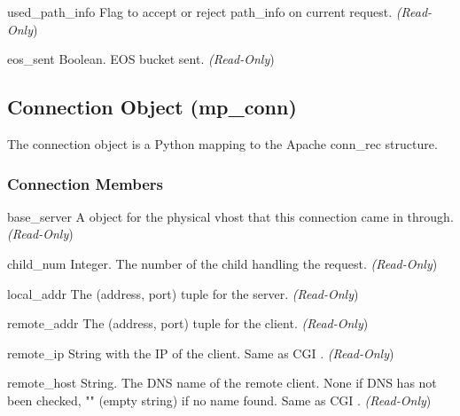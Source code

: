 \begin{memberdesc}[Request]{used_path_info}
Flag to accept or reject path_info on current request.
\emph{(Read-Only})
\end{memberdesc}

\begin{memberdesc}[Request]{eos_sent}
Boolean. EOS bucket sent.
\emph{(Read-Only})
\end{memberdesc}

\subsection{Connection Object (mp_conn)\label{pyapi-mpconn}}

The connection object is a Python mapping to the Apache conn_rec
structure.

\subsubsection{Connection Members\label{pyapi-mpconn-mem}}

\begin{memberdesc}[connection]{base_server}
A  object for the physical vhost that this connection came in
through.
\emph{(Read-Only})
\end{memberdesc}

\begin{memberdesc}[connection]{child_num}
Integer. The number of the child handling the request.
\emph{(Read-Only})
\end{memberdesc}

\begin{memberdesc}[connection]{local_addr}
The (address, port) tuple for the server.
\emph{(Read-Only})
\end{memberdesc}

\begin{memberdesc}[connection]{remote_addr}
The (address, port) tuple for the client.
\emph{(Read-Only})
\end{memberdesc}

\begin{memberdesc}[connection]{remote_ip}
String with the IP of the client. Same as CGI .
\emph{(Read-Only})
\end{memberdesc}

\begin{memberdesc}[connection]{remote_host}
String. The DNS name of the remote client. None if DNS has not been
checked, "" (empty string) if no name found. Same as CGI .
\emph{(Read-Only})
\end{memberdesc}

